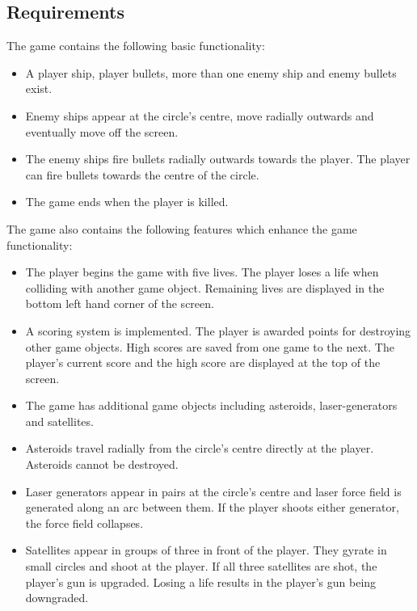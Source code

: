 \documentclass[10pt,twocolumn]{witseiepaper}
\begin{document}
\subsection{Requirements}

The game contains the following basic functionality:

\begin{itemize}
	\item A player ship, player bullets, more than one enemy ship and enemy bullets exist.
	\item Enemy ships appear at the circle's centre, move radially outwards and eventually move off the screen. 
	\item The enemy ships fire bullets radially outwards towards the player. The player can fire bullets towards the centre of the circle.
	\item The game ends when the player is killed.
\end{itemize}

The game also contains the following features which enhance the game functionality:

\begin{itemize}
	\item The player begins the game with five lives. The player loses a life when colliding with another game object. Remaining lives are displayed in the bottom left hand corner of the screen.
	\item A scoring system is implemented. The player is awarded points for destroying other game objects. High scores are saved from one game to the next. The player's current score and the high score are displayed at the top of the screen.
	\item The game has additional game objects including asteroids, laser-generators and satellites.
	\item Asteroids travel radially from the circle's centre directly at the player. Asteroids cannot be destroyed.
	\item Laser generators appear in pairs at the circle's centre and laser force field is generated along an arc between them. If the player shoots either generator, the force field collapses.
	\item Satellites appear in groups of three in front of the player. They gyrate in small circles and shoot at the player. If all three satellites are shot, the player's gun is upgraded. Losing a life results in the player's gun being downgraded.
	
\end{itemize}
\end{document}
